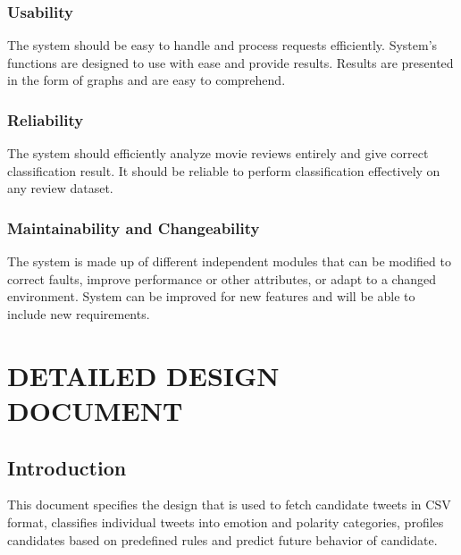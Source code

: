 \documentclass[oneside,a4paper,12pt]{pictreport}
\begin{document}
\subsection{Usability}
The system should be easy to handle and process requests efficiently. System's functions are designed to use with ease and provide results. Results are presented in the form of graphs and are easy to comprehend.

\subsection{Reliability}
The system should efficiently analyze movie reviews entirely and give correct classification result. It should be reliable to perform 
classification effectively on any review dataset.
\subsection{Maintainability and Changeability}
The system is made up of different independent modules that can be modified to correct faults, improve performance or other attributes, or adapt to a changed environment. System can be improved for new features and will be able to include new requirements.

\chapter{DETAILED DESIGN DOCUMENT}

\section{Introduction}
This document specifies the design that is used to fetch candidate tweets in CSV format, classifies individual tweets into emotion and polarity categories, profiles candidates based on predefined rules and predict future behavior of candidate.
\end{document}
